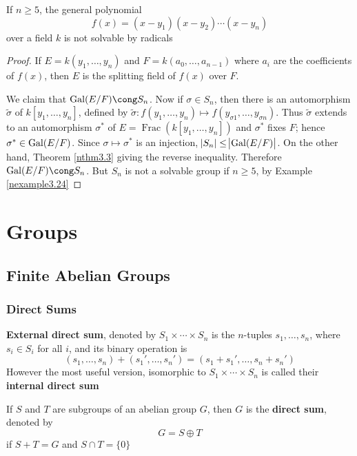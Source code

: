 \documentclass[11pt]{article}
\DeclareMathOperator{\Frac}{Frac}
\begin{document}
\begin{theorem}
If \(n\ge5\), the general polynomial
\begin{equation*}
f(x)=(x-y_1)(x-y_2)\cdots(x-y_n)
\end{equation*}
over a field \(k\) is not solvable by radicals
\end{theorem}
\begin{proof}
If \(E=k(y_1,\dots,y_n)\) and \(F=k(a_0,\dots,a_{n-1})\) where \(a_i\) are
the coefficients of \(f(x)\), then \(E\) is the splitting field of \(f(x)\)
over \(F\).

We claim that \(\Gal(E/F)\cong S_n\). Now if \(\sigma\in S_n\), then there
is an automorphism \(\widetilde{\sigma}\) of \(k[y_1,\dots,y_n]\), defined by 
\(\widetilde{\sigma}:f(y_1,\dots,y_n)\mapsto f(y_{\sigma 1},\dots,y_{\sigma n})\). Thus
\(\widetilde{\sigma}\) extends to an automorphism \(\sigma^*\) of 
\(E=\Frac(k[y_1,\dots,y_n])\) and \(\sigma^*\) fixes \(F\); hence
\(\sigma^*\in\operatorname{Gal}(E/F)\). Since \(\sigma\mapsto\sigma^*\) is an injection, 
\(\abs{S_n}\le\abs{\operatorname{Gal}(E/F)}\). 
On the other hand, Theorem \ref{nthm3.3} giving the reverse inequality.
Therefore \(\Gal(E/F)\cong S_n\). But \(S_n\) is not a solvable group if
\(n\ge5\), by Example \ref{nexample3.24}
\end{proof}




\section{Groups }
\label{sec:orgf016e59}
\subsection{Finite Abelian Groups}
\label{sec:org771b62e}
\subsubsection{Direct Sums}
\label{sec:org75a7d86}
\textbf{External direct sum}, denoted by \(S_1\times\cdots\times S_n\) is the
\(n\)-tuples \(s_1,\dots,s_n\), where \(s_i\in S_i\) for all \(i\), and its
binary operation is 
\begin{equation*}
(s_1,\dots,s_n)+(s_1',\dots,s_n')=(s_1+s_1',\dots,s_n+s_n')
\end{equation*}
However the most useful version, isomorphic to \(S_1\times\cdots\times S_n\)
is called their \textbf{internal direct sum}

\begin{definition}[]
If \(S\) and \(T\) are subgroups of an abelian group \(G\), then \(G\) is the
\textbf{direct sum}, denoted by
\begin{equation*}
G=S\oplus T
\end{equation*}
if \(S+T=G\) and \(S\cap T=\{0\}\)
\end{definition}
\end{document}
